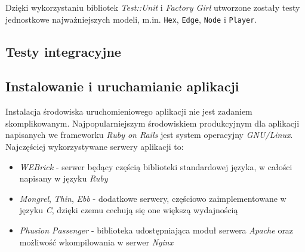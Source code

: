 \documentclass[a4paper,12pt]{article}
\begin{document}
Dzięki wykorzystaniu bibliotek \emph{Test::Unit} i \emph{Factory Girl}
utworzone zostały testy jednostkowe najważniejszych modeli,
m.in. \texttt{Hex}, \texttt{Edge}, \texttt{Node} i \texttt{Player}.

\subsection{Testy integracyjne}




\clearpage

\subsection{Instalowanie i uruchamianie aplikacji}
Instalacja środowiska uruchomieniowego aplikacji nie jest zadaniem
skomplikowanym. Najpopularniejszym środowiskiem produkcyjnym dla
aplikacji napisanych we frameworku \emph{Ruby on Rails} jest system
operacyjny \emph{GNU/Linux}. Najczęściej wykorzystywane serwery
aplikacji to:

\begin{itemize}
\item \emph{WEBrick} - serwer będący częścią biblioteki standardowej
  języka, w całości napisany w języku \emph{Ruby}
\item \emph{Mongrel}, \emph{Thin}, \emph{Ebb} - dodatkowe serwery,
  częściowo zaimplementowane w języku \emph{C}, dzięki czemu cechują
  się one większą wydajnością
\item \emph{Phusion Passenger} - biblioteka udostępniająca moduł
  serwera \emph{Apache} oraz możliwość wkompilowania w serwer
  \emph{Nginx}
\end{itemize}
\end{document}
